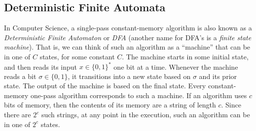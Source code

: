 \subsection{Deterministic Finite Automata}\label{secdfa}

In Computer Science, a single-pass constant-memory algorithm is also
known as a \emph{Deterministic Finite Automaton} or \emph{DFA} (another
name for DFA's is a \emph{finite state machine}). That is, we can think
of such an algorithm as a ``machine'' that can be in one of \(C\)
states, for some constant \(C\). The machine starts in some initial
state, and then reads its input \(x\in \{0,1\}^*\) one bit at a time.
Whenever the machine reads a bit \(\sigma \in \{0,1\}\), it transitions
into a new state based on \(\sigma\) and its prior state. The output of
the machine is based on the final state. Every constant-memory one-pass
algorithm corresponds to such a machine. If an algorithm uses \(c\) bits
of memory, then the contents of its memory are a string of length \(c\).
Since there are \(2^c\) such strings, at any point in the execution,
such an algorithm can be in one of \(2^c\) states.

\hypertarget{DFAforparity}{}


